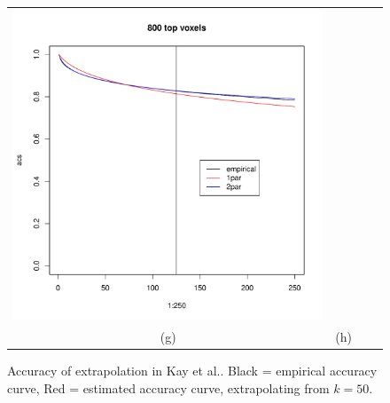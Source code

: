 \documentclass[12pt]{article}
\begin{document}
\begin{figure}
\begin{center}
\begin{tabular}{cccc}
\includegraphics[scale=0.3]{../Yuval/ident_extrap8.pdf} & \\
(g) & (h)  &  
\end{tabular}
\end{center}
\label{fig:data}
\caption{Accuracy of extrapolation in Kay et al..  Black = empirical accuracy curve, Red = estimated accuracy curve, extrapolating from $k = 50$.}
\end{figure}

{}

\end{document}
